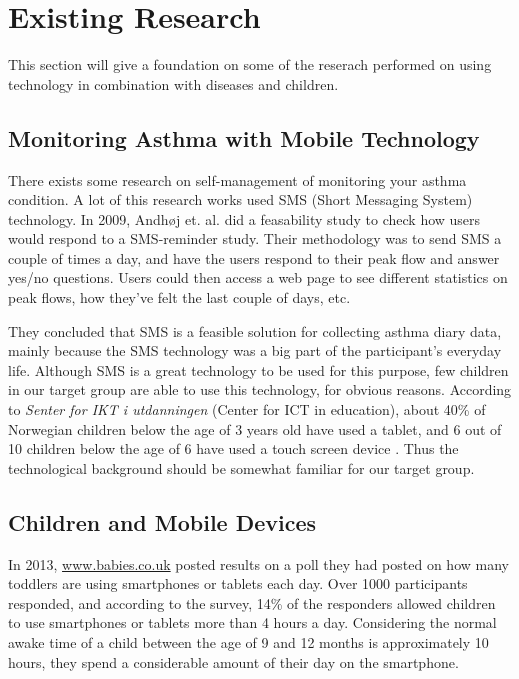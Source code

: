 \section{Existing Research}
\label{sec:existing-research}

This section will give a foundation on some of the reserach performed on using technology in combination with diseases and children. 


\subsection{Monitoring Asthma with Mobile Technology}
There exists some research on self-management of monitoring your asthma condition. A lot of this research works used SMS (Short Messaging System) technology. In 2009, Andh\o j  et. al.\cite{anhoj2004feasibility} did a feasability study to check how users would respond to a SMS-reminder study. Their methodology was to send SMS a couple of times a day, and have the users respond to their peak flow and answer yes/no questions. Users could then access a web page to see different statistics on peak flows, how they've felt the last couple of days, etc.

They concluded that SMS is a feasible solution for collecting asthma diary data, mainly because the SMS technology was a big part of the participant's everyday life. Although SMS is a great technology to be used for this purpose, few children in our target group are able to use this technology, for obvious reasons. According to \emph{Senter for IKT i utdanningen} (Center for ICT in education), about 40\% of Norwegian children below the age of 3 years old have used a tablet, and 6 out of 10 children below the age of 6 have used a touch screen device \cite{nrkchilduse}. Thus the technological background should be somewhat familiar for our target group.  


\subsection{Children and Mobile Devices}
In 2013, \url{www.babies.co.uk} posted results on a poll they had posted on how many toddlers are using smartphones or tablets each day\cite{babiesusageoftablets}. Over 1000 participants responded,  and according to the survey, 14\% of the responders allowed children to use smartphones or tablets more than 4 hours a day. Considering the normal awake time of a child between the age of 9 and 12 months is approximately 10 hours, they spend a considerable amount of their day on the smartphone.         



